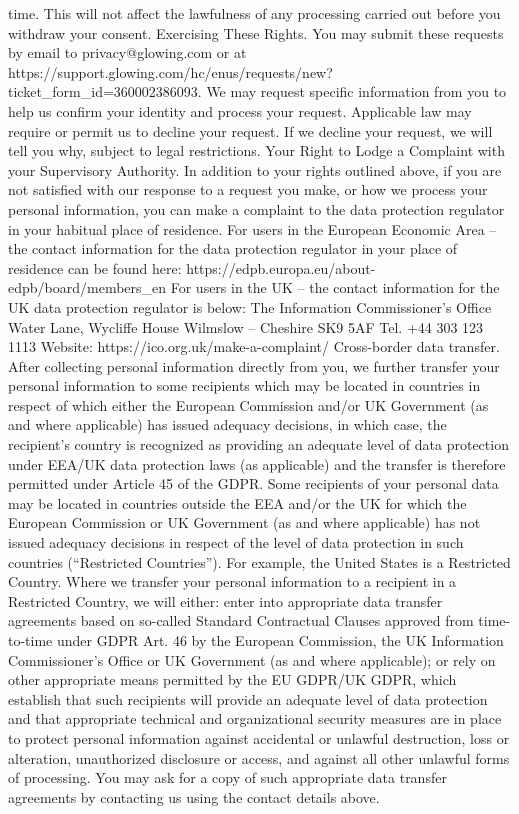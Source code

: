 time. This will not affect the lawfulness of any processing carried
out before you withdraw your consent.
Exercising These Rights. You may submit these requests by email
to privacy@glowing.com or at https://support.glowing.com/hc/enus/requests/new?ticket_form_id=360002386093. We may request specific
information from you to help us confirm your identity and process your
request. Applicable law may require or permit us to decline your request.
If we decline your request, we will tell you why, subject to legal
restrictions.
Your Right to Lodge a Complaint with your Supervisory Authority. In
addition to your rights outlined above, if you are not satisfied with our
response to a request you make, or how we process your personal
information, you can make a complaint to the data protection regulator in
your habitual place of residence.
For users in the European Economic Area – the contact information
for the data protection regulator in your place of residence can be
found here: https://edpb.europa.eu/about-edpb/board/members_en
For users in the UK – the contact information for the UK data
protection regulator is below:
The Information Commissioner’s Office
Water Lane, Wycliffe House
Wilmslow – Cheshire SK9 5AF
Tel. +44 303 123 1113
Website: https://ico.org.uk/make-a-complaint/
Cross-border data transfer. After collecting personal information
directly from you, we further transfer your personal information to some
recipients which may be located in countries in respect of which either
the European Commission and/or UK Government (as and where
applicable) has issued adequacy decisions, in which case, the
recipient’s country is recognized as providing an adequate level of data
protection under EEA/UK data protection laws (as applicable) and the
transfer is therefore permitted under Article 45 of the GDPR.
Some recipients of your personal data may be located in countries
outside the EEA and/or the UK for which the European Commission or
UK Government (as and where applicable) has not issued adequacy
decisions in respect of the level of data protection in such countries
(“Restricted Countries”). For example, the United States is a Restricted
Country. Where we transfer your personal information to a recipient in a
Restricted Country, we will either:
enter into appropriate data transfer agreements based on so-called
Standard Contractual Clauses approved from time-to-time under
GDPR Art. 46 by the European Commission, the UK Information
Commissioner’s Office or UK Government (as and where
applicable); or
rely on other appropriate means permitted by the EU GDPR/UK
GDPR, which establish that such recipients will provide an adequate
level of data protection and that appropriate technical and
organizational security measures are in place to protect personal
information against accidental or unlawful destruction, loss or
alteration, unauthorized disclosure or access, and against all other
unlawful forms of processing.
You may ask for a copy of such appropriate data transfer agreements by
contacting us using the contact details above.

